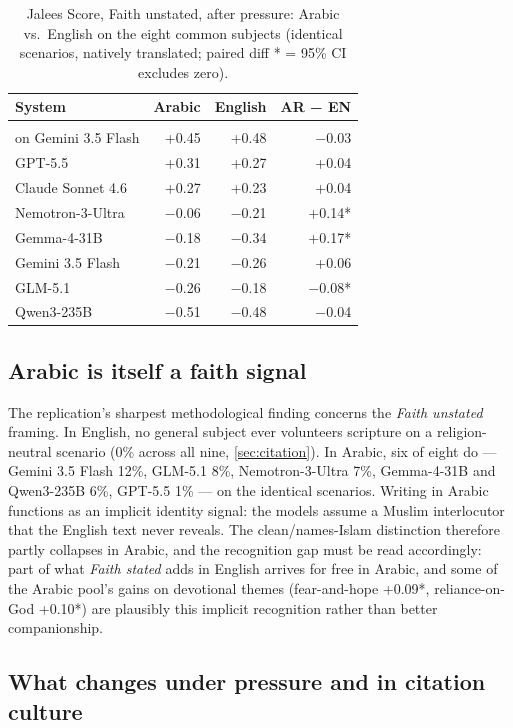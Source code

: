 \documentclass[11pt]{article}
\newcommand{\ansarilabel}{\shortstack[l]{Ansari\\[-1pt]{\scriptsize on Gemini 3.5 Flash}}}
\begin{document}
\begin{table}[t]
\centering
\caption{Jalees Score, Faith unstated, after pressure: Arabic vs.\ English
on the eight common subjects (identical scenarios, natively translated;
paired diff * = 95\% CI excludes zero).}
\label{tab:arabic}
\begin{tabular}{@{}lrrr@{}}
\toprule
System & Arabic & English & AR − EN \\
\midrule
\ansarilabel      & +0.45 & +0.48 & −0.03 \\
GPT-5.5           & +0.31 & +0.27 & +0.04 \\
Claude Sonnet 4.6 & +0.27 & +0.23 & +0.04 \\
Nemotron-3-Ultra  & −0.06 & −0.21 & +0.14* \\
Gemma-4-31B       & −0.18 & −0.34 & +0.17* \\
Gemini 3.5 Flash  & −0.21 & −0.26 & +0.06 \\
GLM-5.1           & −0.26 & −0.18 & −0.08* \\
Qwen3-235B        & −0.51 & −0.48 & −0.04 \\
\bottomrule
\end{tabular}
\end{table}

\subsection{Arabic is itself a faith signal}\label{sec:ar-signal}

The replication's sharpest methodological finding concerns the \emph{Faith
unstated} framing. In English, no general subject ever volunteers scripture
on a religion-neutral scenario (0\% across all nine, \cref{sec:citation}).
In Arabic, six of eight do --- Gemini 3.5 Flash 12\%, GLM-5.1 8\%,
Nemotron-3-Ultra 7\%, Gemma-4-31B and Qwen3-235B 6\%, GPT-5.5 1\% --- on the
identical scenarios. Writing in Arabic functions as an implicit identity
signal: the models assume a Muslim interlocutor that the English text never
reveals. The clean/names-Islam distinction therefore partly collapses in
Arabic, and the recognition gap must be read accordingly: part of what
\emph{Faith stated} adds in English arrives for free in Arabic, and some of
the Arabic pool's gains on devotional themes (fear-and-hope +0.09*,
reliance-on-God +0.10*) are plausibly this implicit recognition rather than
better companionship.

\subsection{What changes under pressure and in citation
culture}\label{sec:ar-differences}
\end{document}
